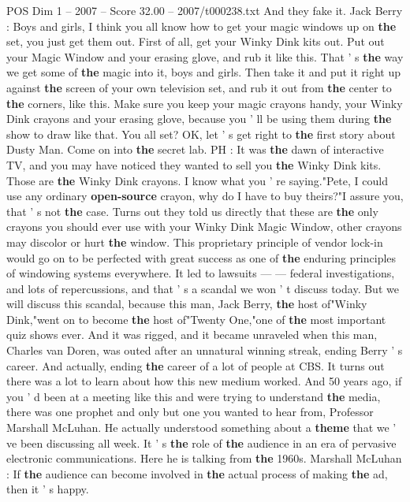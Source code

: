 \begin{textsample}{POS Dim 1 – 2007 – Score 32.00 – 2007/t000238.txt}
And they fake it.
Jack Berry : Boys and girls, I think you all know how to get your magic windows up on \textbf{the} set, you just get them out.
First of all, get your Winky Dink kits out.
Put out your Magic Window and your erasing glove, and rub it like this.
That ' s \textbf{the} way we get some of \textbf{the} magic into it, boys and girls.
Then take it and put it right up against \textbf{the} screen of your own television set, and rub it out from \textbf{the} center to \textbf{the} corners, like this.
Make sure you keep your magic crayons handy, your Winky Dink crayons and your erasing glove, because you ' ll be using them during \textbf{the} show to draw like that.
You all set?
OK, let ' s get right to \textbf{the} first story about Dusty Man.
Come on into \textbf{the} secret lab.
PH : It was \textbf{the} dawn of interactive TV, and you may have noticed they wanted to sell you \textbf{the} Winky Dink kits.
Those are \textbf{the} Winky Dink crayons.
I know what you ' re saying."Pete, I could use any ordinary \textbf{open-source} crayon, why do I have to buy theirs?"I assure you, that ' s not \textbf{the} case.
Turns out they told us directly that these are \textbf{the} only crayons you should ever use with your Winky Dink Magic Window, other crayons may discolor or hurt \textbf{the} window.
This proprietary principle of vendor lock-in would go on to be perfected with great success as one of \textbf{the} enduring principles of windowing systems everywhere.
It led to lawsuits — — federal investigations, and lots of repercussions, and that ' s a scandal we won ' t discuss today.
But we will discuss this scandal, because this man, Jack Berry, \textbf{the} host of"Winky Dink,"went on to become \textbf{the} host of"Twenty One,"one of \textbf{the} most important quiz shows ever.
And it was rigged, and it became unraveled when this man, Charles van Doren, was outed after an unnatural winning streak, ending Berry ' s career.
And actually, ending \textbf{the} career of a lot of people at CBS.
It turns out there was a lot to learn about how this new medium worked.
And 50 years ago, if you ' d been at a meeting like this and were trying to understand \textbf{the} media, there was one prophet and only but one you wanted to hear from, Professor Marshall McLuhan.
He actually understood something about a \textbf{theme} that we ' ve been discussing all week.
It ' s \textbf{the} role of \textbf{the} audience in an era of pervasive electronic communications.
Here he is talking from \textbf{the} 1960s.
Marshall McLuhan : If \textbf{the} audience can become involved in \textbf{the} actual process of making \textbf{the} ad, then it ' s happy.

\end{textsample}

